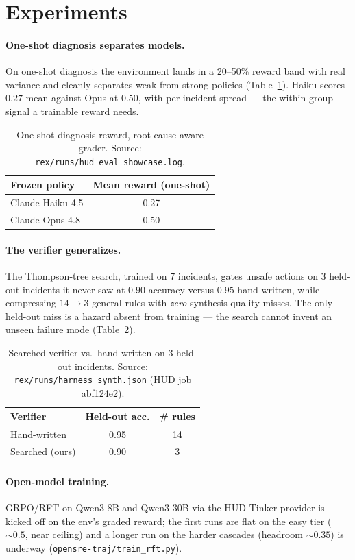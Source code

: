 \section{Experiments}
\label{sec:exp}


\paragraph{One-shot diagnosis separates models.}
On one-shot diagnosis the environment lands in a 20--50\% reward band with real variance and
cleanly separates weak from strong policies (Table~\ref{tab:models}). Haiku scores
\(0.27\) mean against Opus at \(0.50\), with per-incident spread --- the within-group signal a
trainable reward needs.

\begin{table}[t]
\centering
\begin{tabular}{lc}
\toprule
Frozen policy & Mean reward (one-shot) \\
\midrule
Claude Haiku 4.5   & 0.27 \\
Claude Opus 4.8    & 0.50 \\
\bottomrule
\end{tabular}
\caption{One-shot diagnosis reward, root-cause-aware grader.
Source: \texttt{rex/runs/hud\_eval\_showcase.log}.}
\label{tab:models}
\end{table}

\paragraph{The verifier generalizes.}
The Thompson-tree search, trained on 7 incidents, gates unsafe actions on 3 held-out incidents
it never saw at \(0.90\) accuracy versus \(0.95\) hand-written, while compressing
\(14 \rightarrow 3\) general rules with \emph{zero} synthesis-quality misses. The only
held-out miss is a hazard absent from training --- the search cannot invent an unseen failure
mode (Table~\ref{tab:verifier}).

\begin{table}[t]
\centering
\begin{tabular}{lcc}
\toprule
Verifier & Held-out acc. & \# rules \\
\midrule
Hand-written      & 0.95 & 14 \\
Searched (ours)   & 0.90 & 3  \\
\bottomrule
\end{tabular}
\caption{Searched verifier vs.\ hand-written on 3 held-out incidents.
Source: \texttt{rex/runs/harness\_synth.json} (HUD job abf124e2).}
\label{tab:verifier}
\end{table}

\paragraph{Open-model training.}
GRPO/RFT on Qwen3-8B and Qwen3-30B via the HUD Tinker provider is kicked off on the env's
graded reward; the first runs are flat on the easy tier (\(\sim\!0.5\), near ceiling) and a
longer run on the harder cascades (headroom \(\sim\!0.35\)) is underway
(\texttt{opensre-traj/train\_rft.py}).
